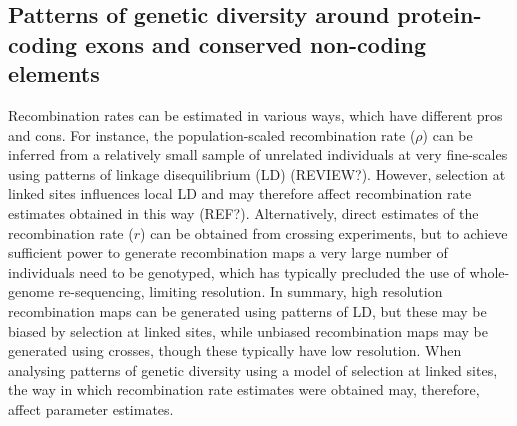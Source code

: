\subsection{Patterns of genetic diversity around protein-coding exons and conserved non-coding elements}

\begin{figure}[h]
   \centering      
   \noindent{}
 \caption[The ]
 
 \label{fig:1}
\end{figure}

	Recombination rates can be estimated in various ways, which have different pros and cons. For instance, the population-scaled recombination rate ($\rho$) can be inferred from a relatively small sample of unrelated individuals at very fine-scales using patterns of linkage disequilibrium (LD) (REVIEW?). However, selection at linked sites influences local LD and may therefore affect recombination rate estimates obtained in this way (REF?). Alternatively, direct estimates of the recombination rate ($r$) can be obtained from crossing experiments, but to achieve sufficient power to generate recombination maps a very large number of individuals need to be genotyped, which has typically precluded the use of whole-genome re-sequencing, limiting resolution. In summary, high resolution recombination maps can be generated using patterns of LD, but these may be biased by selection at linked sites, while unbiased recombination maps may be generated using crosses, though these typically have low resolution. When analysing patterns of genetic diversity using a model of selection at linked sites, the way in which recombination rate estimates were obtained may, therefore, affect parameter estimates.


